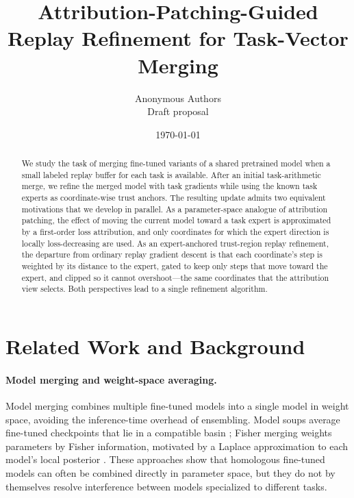 \documentclass[11pt]{article}
\title{Attribution-Patching-Guided Replay Refinement for Task-Vector Merging}
\author{Anonymous Authors \\
\small Draft proposal}
\date{\today}
\begin{document}
\maketitle

\begin{abstract}
We study the task of merging fine-tuned variants of a shared pretrained model when a small labeled replay buffer for each task is available.
After an initial task-arithmetic merge, we refine the merged model with task gradients while using the known task experts as coordinate-wise trust anchors.
The resulting update admits two equivalent motivations that we develop in parallel. As a parameter-space analogue of attribution patching, the effect of moving the current model toward a task expert is approximated by a first-order loss attribution, and only coordinates for which the expert direction is locally loss-decreasing are used. As an expert-anchored trust-region replay refinement, the departure from ordinary replay gradient descent is that each coordinate's step is weighted by its distance to the expert, gated to keep only steps that move toward the expert, and clipped so it cannot overshoot---the same coordinates that the attribution view selects. Both perspectives lead to a single refinement algorithm.
\end{abstract}

\section{Related Work and Background}

\paragraph{Model merging and weight-space averaging.}
Model merging combines multiple fine-tuned models into a single model in weight space, avoiding the inference-time overhead of ensembling. Model soups average fine-tuned checkpoints that lie in a compatible basin \citep{wortsman2022modelsoups}; Fisher merging weights parameters by Fisher information, motivated by a Laplace approximation to each model's local posterior \citep{matena2022fisher}. These approaches show that homologous fine-tuned models can often be combined directly in parameter space, but they do not by themselves resolve interference between models specialized to different tasks.
\end{document}
